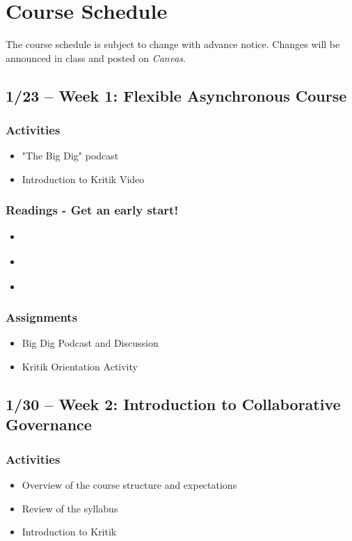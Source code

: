 \documentclass[12pt, letterpaper]{article}
\begin{document}
\newpage


\section*{Course Schedule}

The course schedule is subject to change with advance notice. Changes will be announced in class and posted on \emph{Canvas}.

\subsection*{1/23 -- Week 1: Flexible Asynchronous Course}
    \subsubsection*{Activities}
        \begin{itemize}
            \item "The Big Dig" podcast
            \item Introduction to Kritik Video
        \end{itemize}   
    \subsubsection*{Readings - Get an early start!}
        \begin{itemize}
            \item \citet[chapter 1]{Agranoff2012}
            \item \citet[chapter 1]{Agranoff2023}
            \item \citet[chapter 1]{Henderson2015}
        \end{itemize}
    \subsubsection*{Assignments}
        \begin{itemize}
            \item Big Dig Podcast and Discussion
            \item Kritik Orientation Activity
        \end{itemize}

\subsection*{1/30 -- Week 2: Introduction to Collaborative Governance}
    \subsubsection*{Activities}
        \begin{itemize}
            \item Overview of the course structure and expectations
            \item Review of the syllabus
            \item Introduction to Kritik
        \end{itemize}
\end{document}
